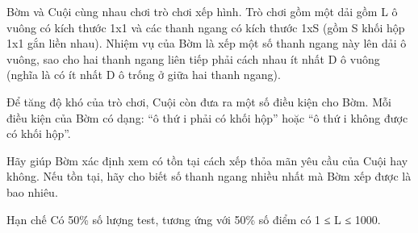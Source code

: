 Bờm và Cuội cùng nhau chơi trò chơi xếp hình. Trò chơi gồm một dải gồm L ô vuông có kích thước 1x1 và các thanh ngang có kích thước 1xS (gồm S khối hộp 1x1 gắn liền nhau). Nhiệm vụ của Bờm là xếp một số thanh ngang này lên dải ô vuông, sao cho hai thanh ngang liên tiếp phải cách nhau ít nhất D ô vuông (nghĩa là có ít nhất D ô trống ở giữa hai thanh ngang).

Để tăng độ khó của trò chơi, Cuội còn đưa ra một số điều kiện cho Bờm. Mỗi điều kiện của Bờm có dạng: “ô thứ i phải có khối hộp” hoặc “ô thứ i không được có khối hộp”.

Hãy giúp Bờm xác định xem có tồn tại cách xếp thỏa mãn yêu cầu của Cuội hay không. Nếu tồn tại, hãy cho biết số thanh ngang nhiều nhất mà Bờm xếp được là bao nhiêu.

Hạn chế
Có 50\% số lượng test, tương ứng với 50\% số điểm có 1 ≤ L ≤ 1000.